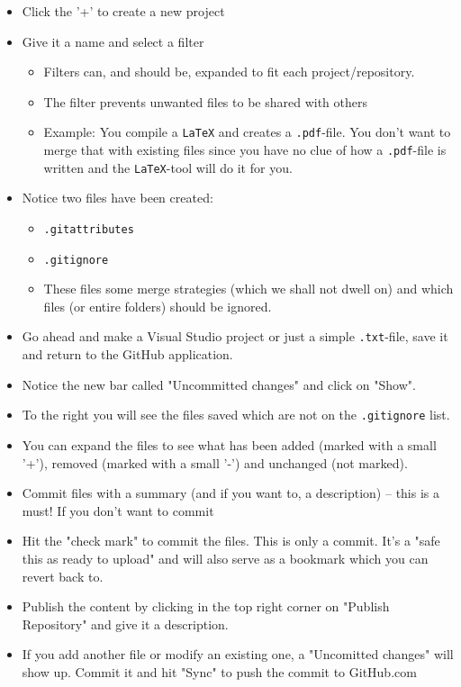 \documentclass{article}
\begin{document}
\begin{itemize}
\item Click the '+' to create a new project

\item Give it a name and select a filter

	\begin{itemize}
	\item Filters can, and should be, expanded to fit each project/repository.
	\item The filter prevents unwanted files to be shared with others
	\item[] Example: You compile a \texttt{LaTeX} and creates a \texttt{.pdf}-file.
	You don't want to merge that with existing files since you have no clue of how a \texttt{.pdf}-file is written and the \texttt{LaTeX}-tool will do it for you.
	\end{itemize}

\item Notice two files have been created:
	
	\begin{itemize}
	\item \texttt{.gitattributes}
	\item \texttt{.gitignore}

	\item[] These files some merge strategies (which we shall not dwell on) and which files (or entire folders) should be ignored.
	\end{itemize}

\item Go ahead and make a Visual Studio project or just a simple \texttt{.txt}-file, save it and return to the GitHub application.

\item Notice the new bar called "Uncommitted changes" and click on "Show".

\item To the right you will see the files saved which are not on the \texttt{.gitignore} list.

\item You can expand the files to see what has been added (marked with a small '+'), removed (marked with a small '-') and unchanged (not marked).

\item Commit files with a summary (and if you want to, a description) -- this is a must!
\subitem If you don't want to commit 

\item Hit the "check mark" to commit the files.
\subitem This is only a commit. It's a "safe this as ready to upload" and will also serve as a bookmark which you can revert back to.

\item Publish the content by clicking in the top right corner on "Publish Repository" and give it a description.

\item If you add another file or modify an existing one, a "Uncomitted changes" will show up.
\subitem Commit it and hit "Sync" to push the commit to GitHub.com





\end{itemize}
\end{document}

